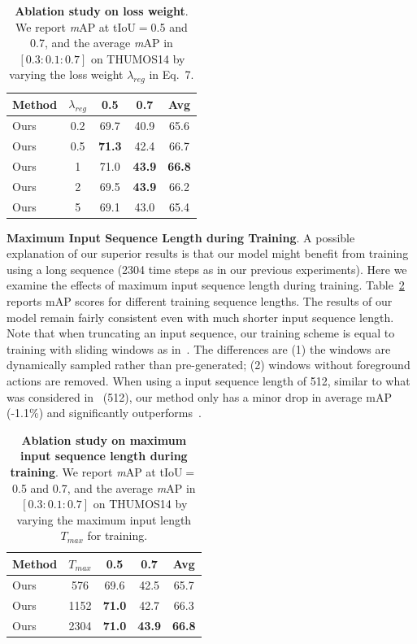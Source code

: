 \begin{table}[th!]
\caption{\label{ablation3}\textbf{Ablation study on loss weight}. We report \textit{m}AP at tIoU$=$0.5 and 0.7, and the average \textit{m}AP in $[0.3:0.1:0.7]$ on THUMOS14 by varying the loss weight $\lambda_{reg}$ in Eq.\ 7.}

\centering 
{
  \setlength{\tabcolsep}{2.5pt}
  \begin{tabular}{l|c|c|c|c}
  Method  & $\lambda_{reg}$ & 0.5           & 0.7           & Avg          \\
  \hline
  Ours    & 0.2   & 69.7          & 40.9           & 65.6          \\
  Ours    & 0.5   & \textbf{71.3}           & 42.4          & 66.7          \\
  Ours    & 1     & 71.0          & \textbf{43.9}          & \textbf{66.8}          \\
  Ours    & 2     & 69.5           & \textbf{43.9}           & 66.2         \\
  Ours    & 5     & 69.1  & 43.0  & 65.4  \\
  \end{tabular}
}
\end{table}

\noindent \textbf{Maximum Input Sequence Length during Training}. A possible explanation of our superior results is that our model might benefit from training using a long sequence (2304 time steps as in our previous experiments). Here we examine the effects of maximum input sequence length during training. Table~\ref{ablation4} reports mAP scores for different training sequence lengths. The results of our model remain fairly consistent even with much shorter input sequence length. Note that when truncating an input sequence, our training scheme is equal to training with sliding windows as in~\cite{a2nettip2020}. The differences are (1) the windows are dynamically sampled rather than pre-generated; (2) windows without foreground actions are removed. When using a input sequence length of 512, similar to what was considered in~\cite{a2nettip2020} (512), our method only has a minor drop in average mAP (-1.1\%) and significantly outperforms~\cite{a2nettip2020}.


\begin{table}[th!]
\caption{\label{ablation4}\textbf{Ablation study on maximum input sequence length during training}. We report \textit{m}AP at tIoU$=$0.5 and 0.7, and the average \textit{m}AP in $[0.3:0.1:0.7]$ on THUMOS14 by varying the maximum input length $T_{max}$ for training.}
\centering
{
  \setlength{\tabcolsep}{2.5pt}
  \begin{tabular}{l|c|c|c|c}
  Method  & $T_{max}$ & 0.5           & 0.7           & Avg          \\
  \hline
  Ours    & 576     &  69.6     & 42.5      &  65.7    \\
  Ours    & 1152     & \textbf{71.0}   & 42.7  & 66.3     \\
  Ours    & 2304     & \textbf{71.0}   & \textbf{43.9} & \textbf{66.8}  \\
  \end{tabular}
}
\end{table}

